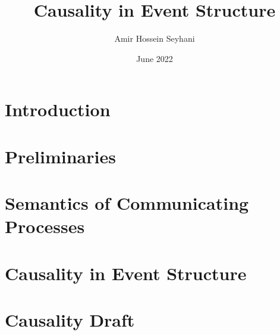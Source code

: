 \documentclass{article}
\title{Causality in Event Structure}
\author{Amir Hossein Seyhani}
\date{June 2022}
\begin{document}
\maketitle

\tableofcontents
\pagebreak

\section{Introduction}

\section{Preliminaries}


\section{Semantics of Communicating Processes}


\section{Causality in Event Structure}


\section{Causality Draft}


\pagebreak
\begin{appendices}
\end{appendices}
\end{document}
